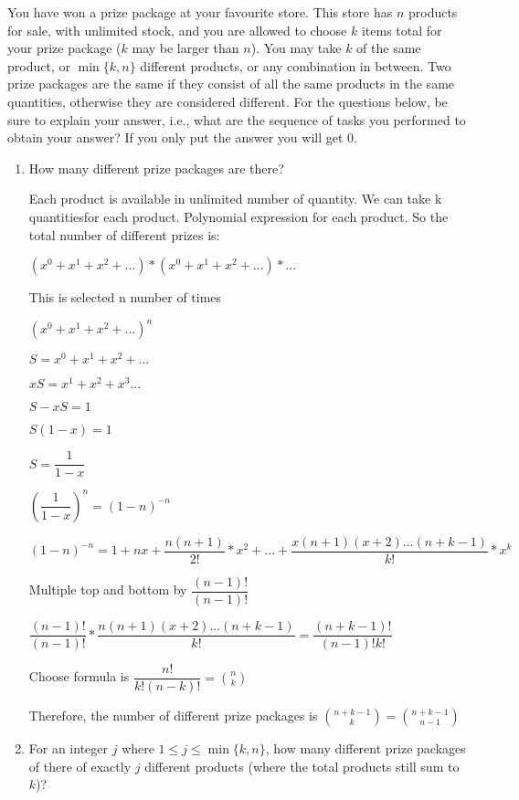\documentclass[12pt]{article}
\newcounter{ques}
\newenvironment{question}{\refstepcounter{ques}{\noindent\bf Question \arabic{ques}:}}{\vspace{5mm}}
\begin{document}
\begin{question}
	You have won a prize package at your favourite store. This store has $n$ products for sale, with unlimited stock, and you are allowed to choose $k$ items total for your prize package ($k$ may be larger than $n$). You may take $k$ of the same product, or $\min\{k,n\}$ different products, or any combination in between. Two prize packages are the same if they consist of all the same products in the same quantities, otherwise they are considered different. For the questions below, be sure to explain your answer, i.e., what are the sequence of tasks you performed to obtain your answer? If you only put the answer you will get $0$. 
	
	\begin{enumerate}[label = (\alph*)]
		\item How many different prize packages are there?
		
		Each product is available in unlimited number of quantity. We can take k quantitiesfor each product.
		Polynomial expression for each product.
		So the total number of different prizes is:

		$(x^0 + x^1 + x^2 + ...)*(x^0 + x^1 + x^2 + ...)*...$

		This is selected n number of times

		$(x^0 + x^1 + x^2 + ...)^n$

		$S = x^0 + x^1 + x^2 + ...$
		
		$xS = x^1 + x^2 + x^3 ...$

		$S-xS = 1$

		$S(1-x) = 1$

		$S = \dfrac{1}{1-x}$


		$(\dfrac{1}{1-x})^n = (1-n)^{-n}$

		$(1-n)^{-n} = 1+nx + \dfrac{n(n+1)}{2!}*x^2+ ... + \dfrac{x(n+1)(x+2)...(n+k-1)}{k!}*x^k$

		Multiple top and bottom by $\dfrac{(n-1)!}{(n-1)!}$

		$\dfrac{(n-1)!}{(n-1)!}*\dfrac{n(n+1)(x+2)...(n+k-1)}{k!} = \dfrac{(n+k-1)!}{(n-1)!k!}$

		Choose formula is $\dfrac{n!}{k!(n-k)!} = {n\choose k}$

		Therefore, the number of different prize packages is ${{n+k-1}\choose{k}} = {{n+k-1}\choose{n-1}}$

		\item For an integer $j$ where $1\leq j \leq \min\{k,n\}$, how many different prize packages of there of exactly $j$ different products (where the total products still sum to $k$)? 
		

\end{enumerate}
\end{question}
\end{document}
